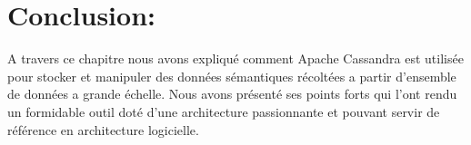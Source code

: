 \section{Conclusion:}
A travers ce chapitre nous avons expliqué comment Apache Cassandra est utilisée pour stocker et manipuler des données sémantiques récoltées a partir d'ensemble de données a grande échelle. Nous avons présenté ses points forts qui l'ont rendu un formidable outil doté d'une architecture passionnante et pouvant servir de référence en architecture logicielle.